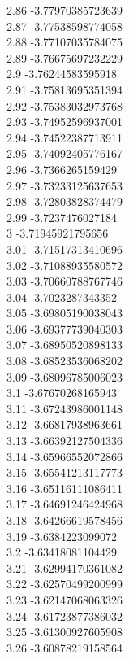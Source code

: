 {2.86	-3.77970385723639\\
2.87	-3.77538598774058\\
2.88	-3.77107035784075\\
2.89	-3.76675697232229\\
2.9	-3.76244583595918\\
2.91	-3.75813695351394\\
2.92	-3.75383032973768\\
2.93	-3.74952596937001\\
2.94	-3.74522387713911\\
2.95	-3.74092405776167\\
2.96	-3.7366265159429\\
2.97	-3.73233125637653\\
2.98	-3.72803828374479\\
2.99	-3.7237476027184\\
3	-3.71945921795656\\
3.01	-3.71517313410696\\
3.02	-3.71088935580572\\
3.03	-3.70660788767746\\
3.04	-3.7023287343352\\
3.05	-3.69805190038043\\
3.06	-3.69377739040303\\
3.07	-3.68950520898133\\
3.08	-3.68523536068202\\
3.09	-3.68096785006023\\
3.1	-3.67670268165943\\
3.11	-3.67243986001148\\
3.12	-3.66817938963661\\
3.13	-3.66392127504336\\
3.14	-3.65966552072866\\
3.15	-3.65541213117773\\
3.16	-3.65116111086411\\
3.17	-3.64691246424968\\
3.18	-3.64266619578456\\
3.19	-3.6384223099072\\
3.2	-3.63418081104429\\
3.21	-3.62994170361082\\
3.22	-3.62570499200999\\
3.23	-3.62147068063326\\
3.24	-3.61723877386032\\
3.25	-3.61300927605908\\
3.26	-3.60878219158564\\
}
